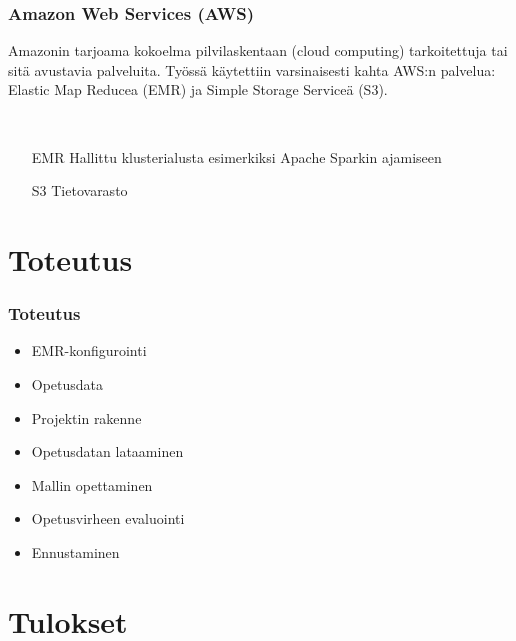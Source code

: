 \documentclass{beamer}
\begin{document}
\begin{frame}
\frametitle{Amazon Web Services (AWS)}

Amazonin tarjoama kokoelma pilvilaskentaan (cloud computing) tarkoitettuja tai sitä avustavia palveluita.
Työssä käytettiin varsinaisesti kahta AWS:n palvelua: Elastic Map Reducea (EMR) ja Simple Storage Serviceä (S3).

~

\begin{itemize}
	\item [EMR] Hallittu klusterialusta esimerkiksi Apache Sparkin ajamiseen
	\item [S3] Tietovarasto
\end{itemize}

\end{frame}


\section{Toteutus}

\begin{frame}
\frametitle{Toteutus}

\begin{itemize}
	\item EMR-konfigurointi
	\item Opetusdata
	\item Projektin rakenne
	\item Opetusdatan lataaminen
	\item Mallin opettaminen
	\item Opetusvirheen evaluointi
	\item Ennustaminen
\end{itemize}

\end{frame}


\section{Tulokset}
\end{document}

